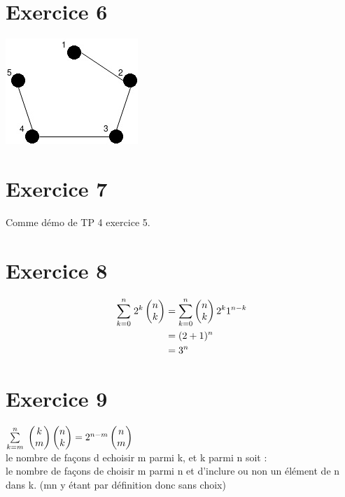 \documentclass[fontsize=10pt]{article}
\begin{document}
\section*{Exercice 6}
\includegraphics[scale=1]{TP6Exo5.jpg} 

\section*{Exercice 7}
Comme démo de TP 4 exercice 5.

\section*{Exercice 8}
\begin{alignat*}{5}
\underset{k=0}{\overset{n}{\sum}} \hspace{0.1cm}2^k\begin{pmatrix} n \\k\end{pmatrix} &= \underset{k=0}{\overset{n}{\sum}} \begin{pmatrix} n \\k\end{pmatrix} 2^k 1^{n-k}\\
&=(2+1)^n\\
&=3^n
\end{alignat*}

\section*{Exercice 9}

$\underset{k=m}{\overset{n}{\sum}}\hspace{0.1cm}\begin{pmatrix} k\\m\end{pmatrix}\begin{pmatrix} n\\k\end{pmatrix} = 2^{n-m}\begin{pmatrix} n\\m\end{pmatrix}$\\
le nombre de façons d echoisir m parmi k, et k parmi n soit : \\
le nombre de façons de choisir m parmi n et d'inclure ou non un élément de n dans k. (mn y étant par définition donc sans choix)
\end{document}
